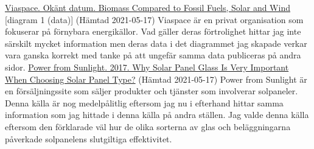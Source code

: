 \documentclass{article}
\begin{document}
\href{http://www.viaspace.com/biomass_versus_alternatives.php}{Viaspace. Okänt datum. Biomass Compared to Fossil Fuels, Solar and Wind}
[diagram 1 (data)] (Hämtad 2021-05-17)
Viaspace är en privat organisation som fokuserar på förnybara energikällor. Vad gäller deras förtrolighet hittar jag inte särskilt mycket information men deras data i det diagrammet jag skapade verkar vara ganska korrekt med tanke på att ungefär samma data publiceras på andra sidor.
\newline
\newline
\href{https://www.powerfromsunlight.com/why-solar-panel-glass-is-very-important-when-choosing-solar-panel-type/}{Power from Sunlight. 2017. Why Solar Panel Glass Is Very Important When Choosing Solar Panel Type?}
(Hämtad 2021-05-17)
Power from Sunlight är en försäljningssite som säljer produkter och tjänster som involverar solpaneler. Denna källa är nog medelpålitlig eftersom jag nu i efterhand hittar samma information som jag hittade i denna källa på andra ställen. Jag valde denna källa eftersom den förklarade väl hur de olika sorterna av glas och beläggningarna påverkade solpanelens slutgiltiga effektivitet.
\end{document}

